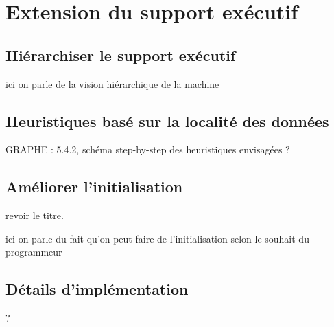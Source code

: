 \section{Extension du support exécutif}

\subsection{Hiérarchiser le support exécutif}

ici on parle de la vision hiérarchique de la machine


\subsection{Heuristiques basé sur la localité des données}\label{sec:contrib:ws:heuristics}

GRAPHE : 5.4.2, schéma step-by-step des heuristiques envisagées ?

\subsection{Améliorer l'initialisation}

revoir le titre.

ici on parle du fait qu'on peut faire de l'initialisation selon le souhait du programmeur

\subsection{Détails d'implémentation}

?
